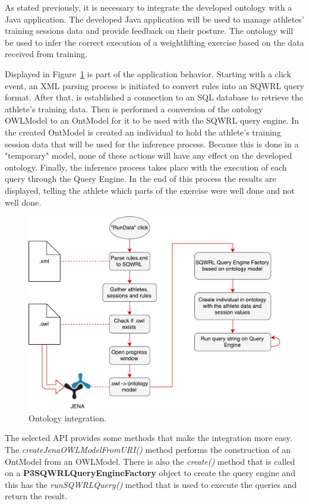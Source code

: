 As stated previously, it is necessary to integrate the developed ontology with a Java application.
The developed Java application will be used to manage athletes' training sessions data and provide feedback on their posture.
The ontology will be used to infer the correct execution of a weightlifting exercise based on the data received from training.

Displayed in Figure~\ref{fig:ont_int} is part of the application behavior.
Starting with a click event, an XML parsing process is initiated to convert rules into an SQWRL query format.
After that, is established a connection to an SQL database to retrieve the athlete's training data.
Then is performed a conversion of the ontology OWLModel to an OntModel for it to be used with the SQWRL query engine.
In the created OntModel is created an individual to hold the athlete's training session data that will be used for the inference process.
Because this is done in a "temporary" model, none of these actions will have any effect on the developed ontology.
Finally, the inference process takes place with the execution of each query through the Query Engine.
In the end of this process the results are displayed, telling the athlete which parts of the exercise were well done and not well done.

\begin{figure}[h]
	\centering
		\includegraphics[width=1.00\textwidth]{Images/integration.pdf}
	\caption{Ontology integration.}
	\label{fig:ont_int}
\end{figure}

The selected API provides some methods that make the integration more easy.
The \textit{createJenaOWLModelFromURI()} method performs the construction of an OntModel from an OWLModel.
There is also the \textit{create()} method that is called on a \textbf{P3SQWRLQueryEngineFactory} object to create the query engine and this has the \textit{runSQWRLQuery()} method that is used to execute the queries and return the result. 
